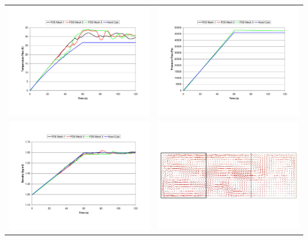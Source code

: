 \documentclass[11pt]{book}
\begin{document}
\noindent
\begin{tabular*}{\textwidth}{lr}
\includegraphics[width=3.2in]{FIGURES/pressure_rise_T} &
\includegraphics[width=3.2in]{FIGURES/pressure_rise_P} \\
\includegraphics[width=3.2in]{FIGURES/pressure_rise_R} &
\includegraphics[width=3.2in]{FIGURES/pressure_rise_1000}
\end{tabular*}
\end{document}
